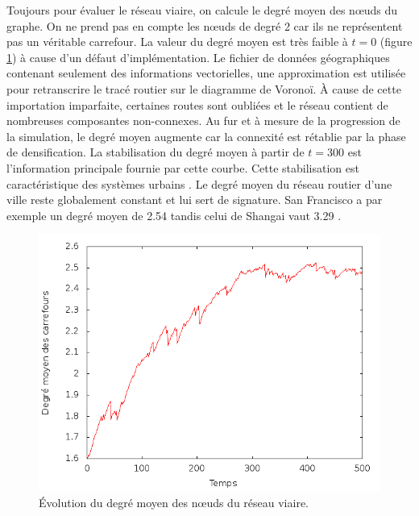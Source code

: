 \documentclass[10pt]{article}
\begin{document}


Toujours pour évaluer le réseau viaire, on calcule le degré moyen des
n\oe uds du graphe. On ne prend pas en compte les n\oe uds de degré 2
car ils ne représentent pas un véritable carrefour. La valeur du degré
moyen est très faible à $t = 0$ (figure \ref{fig:degree}) à cause d'un
défaut d'implémentation. Le fichier de données géographiques contenant
seulement des informations vectorielles, une approximation est
utilisée pour retranscrire le tracé routier sur le diagramme de
Voronoï. À cause de cette importation imparfaite, certaines routes
sont oubliées et le réseau contient de nombreuses composantes
non-connexes. Au fur et à mesure de la progression de la simulation,
le degré moyen augmente car la connexité est rétablie par la phase de
densification. La stabilisation du degré moyen à partir de $t = 300$
est l'information principale fournie par cette courbe. Cette
stabilisation est caractéristique des systèmes urbains
\cite{Strano2012}. Le degré moyen du réseau routier d'une ville reste
globalement constant et lui sert de signature. San Francisco a par
exemple un degré moyen de 2.54 tandis celui de Shangai vaut 3.29
\cite{Leung2011}.

\begin{figure}[H]
  \centering
  \includegraphics[width=.8\linewidth]{images/degree.png}
  \caption{Évolution du degré moyen des n\oe uds du réseau viaire.}
    \label{fig:degree}
\end{figure}
\end{document}
